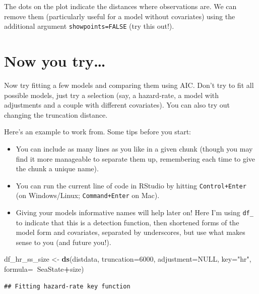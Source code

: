 \documentclass[]{book}
\newenvironment{Shaded}{\begin{snugshade}}{\end{snugshade}}
\newcommand{\KeywordTok}[1]{\textcolor[rgb]{0.13,0.29,0.53}{\textbf{#1}}}
\newcommand{\DataTypeTok}[1]{\textcolor[rgb]{0.13,0.29,0.53}{#1}}
\newcommand{\DecValTok}[1]{\textcolor[rgb]{0.00,0.00,0.81}{#1}}
\newcommand{\StringTok}[1]{\textcolor[rgb]{0.31,0.60,0.02}{#1}}
\newcommand{\OtherTok}[1]{\textcolor[rgb]{0.56,0.35,0.01}{#1}}
\newcommand{\OperatorTok}[1]{\textcolor[rgb]{0.81,0.36,0.00}{\textbf{#1}}}
\newcommand{\NormalTok}[1]{#1}
\providecommand{\tightlist}{%
  \setlength{\itemsep}{0pt}\setlength{\parskip}{0pt}}
\theoremstyle{definition}
\theoremstyle{definition}
\theoremstyle{remark}
\begin{document}
The dots on the plot indicate the distances where observations are. We
can remove them (particularly useful for a model without covariates)
using the additional argument \texttt{showpoints=FALSE} (try this out!).

\section{Now you try\ldots{}}\label{now-you-try}

Now try fitting a few models and comparing them using AIC. Don't try to
fit all possible models, just try a selection (say, a hazard-rate, a
model with adjustments and a couple with different covariates). You can
also try out changing the truncation distance.

Here's an example to work from. Some tips before you start:

\begin{itemize}
\tightlist
\item
  You can include as many lines as you like in a given chunk (though you
  may find it more manageable to separate them up, remembering each time
  to give the chunk a unique name).
\item
  You can run the current line of code in RStudio by hitting
  \texttt{Control+Enter} (on Windows/Linux; \texttt{Command+Enter} on
  Mac).
\item
  Giving your models informative names will help later on! Here I'm
  using \texttt{df\_} to indicate that this is a detection function,
  then shortened forms of the model form and covariates, separated by
  underscores, but use what makes sense to you (and future you!).
\end{itemize}

\begin{Shaded}
\begin{Highlighting}[]
\NormalTok{df_hr_ss_size <-}\StringTok{ }\KeywordTok{ds}\NormalTok{(distdata, }\DataTypeTok{truncation=}\DecValTok{6000}\NormalTok{, }\DataTypeTok{adjustment=}\OtherTok{NULL}\NormalTok{, }
                    \DataTypeTok{key=}\StringTok{"hr"}\NormalTok{, }\DataTypeTok{formula=}\OperatorTok{~}\NormalTok{SeaState}\OperatorTok{+}\NormalTok{size)}
\end{Highlighting}
\end{Shaded}

\begin{verbatim}
## Fitting hazard-rate key function
\end{verbatim}
\end{document}
